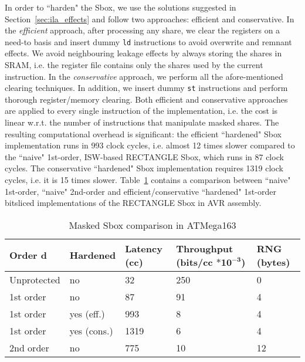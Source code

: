 In order to ``harden" the Sbox, we use the solutions suggested in Section~\ref{sec:ila_effects} and follow two approaches: efficient and conservative. In the \emph{efficient} approach, after processing any share, we clear the registers on a need-to basis and insert dummy \texttt{ld} instructions to avoid overwrite and remnant effects. We avoid neighbouring leakage effects by always storing the shares in SRAM, i.e. the register file contains only the shares used by the current instruction. In the \emph{conservative} approach, we perform all the afore-mentioned clearing techniques. In addition, we insert dummy \texttt{st} instructions and perform thorough register/memory clearing. Both efficient and conservative approaches are applied to every single instruction of the implementation, i.e. the cost is linear w.r.t. the number of instructions that manipulate masked shares. The resulting computational overhead is significant: the efficient ``hardened" Sbox implementation runs in 993 clock cycles, i.e. almost 12 times slower compared to the ``naive" 1st-order, ISW-based RECTANGLE Sbox, which runs in $87$ clock cycles. The conservative ``hardened" Sbox implementation requires 1319 clock cycles, i.e. it is 15 times slower. Table~\ref{cc_table} contains a comparison between ``naive" 1st-order, ``naive" 2nd-order and efficient/conservative ``hardened" 1st-order bitsliced implementations of the RECTANGLE Sbox in AVR assembly.
\begin{table}[H]
\centering
\caption{Masked Sbox comparison in ATMega163}
\label{cc_table}
\begin{tabular}{ |l|l|l|l|l|}
\hline
\textbf{Order $\mathbf{d}$} & \textbf{Hardened} & \textbf{Latency (cc) }& \textbf{Throughput} \textbf{(bits/cc $\mathbf{*10^{-3}}$)} & \textbf{RNG (bytes)} \\ 
\hline \hline 
Unprotected  & no & 32 & 250 & 0 \\ \hline
1st order      &   no & 87 & 91 &  4\\ \hline
 1st order      &   yes (eff.)& 993 & 8 & 4\\ \hline
 1st order      &   yes (cons.) & 1319 & 6 & 4\\ \hline
 2nd order     &   no  & 775 & 10 & 12\\ \hline
\end{tabular}
\end{table}

